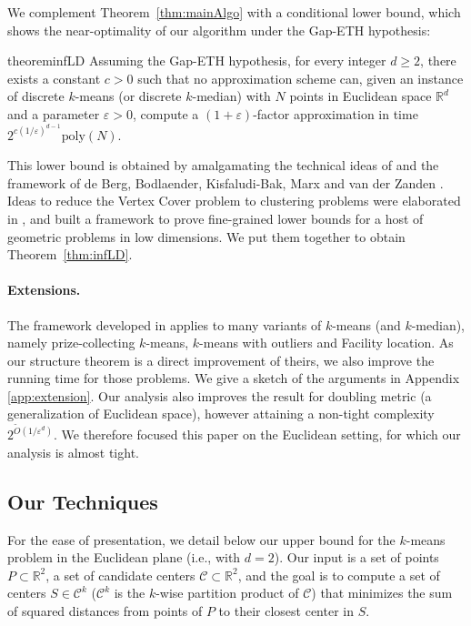 \documentclass[11pt]{article}
\newcommand{\R}{\mathbb R}
\newcommand{\eps}{\varepsilon}
\newcommand{\poly}{\mathrm{ poly}}
\renewcommand{\tilde}{\widetilde}
\newcommand{\calC}{\mathcal {C}}
\begin{document}
We complement Theorem~\ref{thm:mainAlgo} with a conditional lower bound, which shows the near-optimality of our algorithm under the Gap-ETH hypothesis:

\begin{restatable}{theorem}{infLD}
    \label{thm:infLD}
Assuming the Gap-ETH hypothesis, for every integer $d \ge 2$, there exists a constant $c > 0$ such that no approximation scheme can, given an instance of discrete $k$-means (or discrete $k$-median) with $N$ points in Euclidean space $\mathbb{R}^d$ and a parameter $\eps > 0$, compute a $(1+\eps)$-factor approximation in time $2^{c(1/\eps)^{d-1}} \poly(N)$.
\end{restatable}


This lower bound is obtained by amalgamating the technical ideas of \cite{LeeSW17,CohenaddadSODA18,Cohen-AddadS19} and the framework of de Berg, Bodlaender, Kisfaludi-Bak, Marx and van der Zanden \cite{BergBKMZ20}. Ideas to reduce the Vertex Cover problem to clustering problems were elaborated in \cite{LeeSW17,CohenaddadSODA18,Cohen-AddadS19}, and \cite{BergBKMZ20} built a framework  to prove fine-grained lower bounds for a host of geometric problems in low dimensions. We put them together to obtain Theorem~\ref{thm:infLD}.

\paragraph*{Extensions.}
The framework developed in \cite{jacm} applies to many variants of $k$-means (and $k$-median), namely prize-collecting $k$-means, $k$-means with outliers and Facility location. As our structure theorem is a direct improvement of theirs, we also improve the running time for those problems. We give a sketch of the arguments in Appendix \ref{app:extension}. 
Our analysis also improves the result for doubling metric (a generalization of Euclidean space), however attaining a non-tight complexity $2^{\tilde O(1/\eps^d)}$. 
We therefore focused this paper on the Euclidean setting, for which our analysis is almost tight.

\subsection{Our Techniques}\label{sec:overview}
For the ease of presentation, we detail below our upper bound for the $k$-means problem in the Euclidean plane (i.e., with $d=2$). Our input is a set of points  $P \subset \R^2$, a set of candidate centers $\calC\subset \R^2$, and the goal is to compute a set of centers $S \in \calC^k$ ($\calC^k$ is the $k$-wise partition product of $\calC$) that minimizes the sum of  squared distances from points of $P$ to their closest center in $S$.
\end{document}
